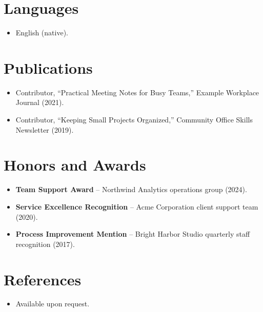 \documentclass[11pt,a4paper,sans]{moderncv}
\begin{document}

\section{Languages}
\vspace{1pt}
\begin{itemize}
\item {English (native).}
\end{itemize}


\section{Publications}
\vspace{1pt}
\begin{itemize}
\item {Contributor, ``Practical Meeting Notes for Busy Teams,'' Example Workplace Journal (2021).}
\item {Contributor, ``Keeping Small Projects Organized,'' Community Office Skills Newsletter (2019).}
\end{itemize}


\section{Honors and Awards}
\vspace{1pt}
\begin{itemize}
\item{\textbf{Team Support Award} -- Northwind Analytics operations group (2024).}
\item{\textbf{Service Excellence Recognition} -- Acme Corporation client support team (2020).}
\item{\textbf{Process Improvement Mention} -- Bright Harbor Studio quarterly staff recognition (2017).}
\end{itemize}


\section{References}
\vspace{1pt}
\begin{itemize}
\item{Available upon request.}
\end{itemize}
\end{document}
